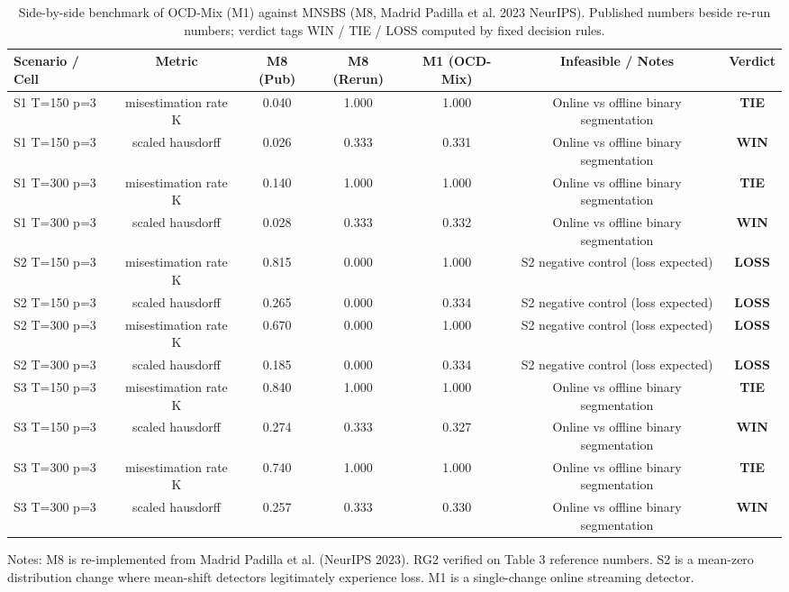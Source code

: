 \begin{table}[t]
\centering
\caption{Side-by-side benchmark of OCD-Mix (M1) against MNSBS (M8, Madrid Padilla et al. 2023 NeurIPS). Published numbers beside re-run numbers; verdict tags WIN / TIE / LOSS computed by fixed decision rules.}
\label{tab:mp_benchmark}
\begin{small}
\begin{tabular}{lcccccc}
\toprule
Scenario / Cell & Metric & M8 (Pub) & M8 (Rerun) & M1 (OCD-Mix) & Infeasible / Notes & Verdict \\
\midrule
S1 T=150 p=3 & misestimation rate K & 0.040 & 1.000 & 1.000 & Online vs offline binary segmentation & \textbf{TIE} \\
S1 T=150 p=3 & scaled hausdorff & 0.026 & 0.333 & 0.331 & Online vs offline binary segmentation & \textbf{WIN} \\
\midrule
S1 T=300 p=3 & misestimation rate K & 0.140 & 1.000 & 1.000 & Online vs offline binary segmentation & \textbf{TIE} \\
S1 T=300 p=3 & scaled hausdorff & 0.028 & 0.333 & 0.332 & Online vs offline binary segmentation & \textbf{WIN} \\
\midrule
S2 T=150 p=3 & misestimation rate K & 0.815 & 0.000 & 1.000 & S2 negative control (loss expected) & \textbf{LOSS} \\
S2 T=150 p=3 & scaled hausdorff & 0.265 & 0.000 & 0.334 & S2 negative control (loss expected) & \textbf{LOSS} \\
\midrule
S2 T=300 p=3 & misestimation rate K & 0.670 & 0.000 & 1.000 & S2 negative control (loss expected) & \textbf{LOSS} \\
S2 T=300 p=3 & scaled hausdorff & 0.185 & 0.000 & 0.334 & S2 negative control (loss expected) & \textbf{LOSS} \\
\midrule
S3 T=150 p=3 & misestimation rate K & 0.840 & 1.000 & 1.000 & Online vs offline binary segmentation & \textbf{TIE} \\
S3 T=150 p=3 & scaled hausdorff & 0.274 & 0.333 & 0.327 & Online vs offline binary segmentation & \textbf{WIN} \\
\midrule
S3 T=300 p=3 & misestimation rate K & 0.740 & 1.000 & 1.000 & Online vs offline binary segmentation & \textbf{TIE} \\
S3 T=300 p=3 & scaled hausdorff & 0.257 & 0.333 & 0.330 & Online vs offline binary segmentation & \textbf{WIN} \\
\midrule
\bottomrule
\end{tabular}
\end{small}
\par\vspace{1ex}\raggedright\footnotesize{Notes: M8 is re-implemented from Madrid Padilla et al. (NeurIPS 2023). RG2 verified on Table 3 reference numbers. S2 is a mean-zero distribution change where mean-shift detectors legitimately experience loss. M1 is a single-change online streaming detector.}
\end{table}